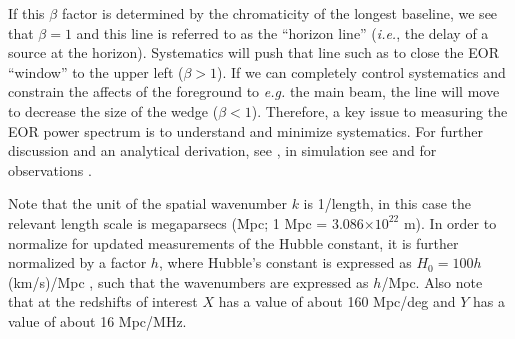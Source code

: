 \documentclass[preprint,11pt]{aastex}
\newcommand{\kvec}{{\bf k}}
\newcommand{\kvpr}{{\kvec_\perp}}
\def\kpar{k_{\|}}
\begin{document}
If this $\beta$ factor is determined by the chromaticity of the longest baseline, we see that $\beta=1$ and this line is referred to as the ``horizon line'' ({\em i.e.}, the delay of a source at the horizon).  Systematics will push that line such as to close the EOR ``window'' to the upper left ($\beta > 1$).  If we can completely control systematics and constrain the affects of the foreground to {\em e.g.} the main beam, the line will move to decrease the size of the wedge ($\beta<1$).
Therefore, a key issue to measuring the EOR power spectrum is to understand and minimize systematics.  For further discussion and an analytical derivation, see \cite{zahn_etal2012,vedantham_2012,liu_et_al2014b},  in simulation see \cite{datta_etal2010,hazelton_et_al2013} and for observations
\cite{pober_etal2013b,2015arXiv150601026P,parsons_etal2014,2015arXiv150206016A}.  


Note that the unit of the spatial wavenumber $k$ is 1/length, in this case the relevant length scale is megaparsecs (Mpc; 1 Mpc = 3.086$\times10^{22}$ m).  In order to normalize for updated measurements of the Hubble constant, it is further normalized by a factor $h$, where Hubble's constant is expressed as $H_0=100h$ (km/s)/Mpc , such that the wavenumbers are expressed as $h$/Mpc.  Also note that at the redshifts of interest $X$ has a value of about 160 Mpc/deg and $Y$ has a value of about 16 Mpc/MHz.

\end{document}
